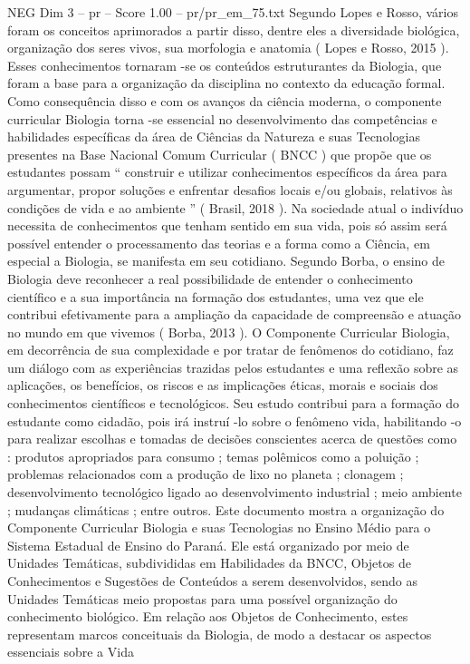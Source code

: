 \begin{textsample}{NEG Dim 3 – pr – Score 1.00 – pr/pr\_em\_75.txt}
Segundo Lopes e Rosso, vários foram os conceitos aprimorados a partir disso, dentre eles a diversidade biológica, organização dos seres vivos, sua morfologia e anatomia ( Lopes e Rosso, 2015 ).
Esses conhecimentos tornaram -se os conteúdos estruturantes da Biologia, que foram a base para a organização da disciplina no contexto da educação formal.
Como consequência disso e com os avanços da ciência moderna, o componente curricular Biologia torna -se essencial no desenvolvimento das competências e habilidades específicas da área de Ciências da Natureza e suas Tecnologias presentes na Base Nacional Comum Curricular ( BNCC ) que propõe que os estudantes possam “ construir e utilizar conhecimentos específicos da área para argumentar, propor soluções e enfrentar desafios locais e/ou globais, relativos às condições de vida e ao ambiente ” ( Brasil, 2018 ).
Na sociedade atual o indivíduo necessita de conhecimentos que tenham sentido em sua vida, pois só assim será possível entender o processamento das teorias e a forma como a Ciência, em especial a Biologia, se manifesta em seu cotidiano.
Segundo Borba, o ensino de Biologia deve reconhecer a real possibilidade de entender o conhecimento científico e a sua importância na formação dos estudantes, uma vez que ele contribui efetivamente para a ampliação da capacidade de compreensão e atuação no mundo em que vivemos ( Borba, 2013 ).
O Componente Curricular Biologia, em decorrência de sua complexidade e por tratar de fenômenos do cotidiano, faz um diálogo com as experiências trazidas pelos estudantes e uma reflexão sobre as aplicações, os benefícios, os riscos e as implicações éticas, morais e sociais dos conhecimentos científicos e tecnológicos.
Seu estudo contribui para a formação do estudante como cidadão, pois irá instruí -lo sobre o fenômeno vida, habilitando -o para realizar escolhas e tomadas de decisões conscientes acerca de questões como : produtos apropriados para consumo ; temas polêmicos como a poluição ; problemas relacionados com a produção de lixo no planeta ; clonagem ; desenvolvimento tecnológico ligado ao desenvolvimento industrial ; meio ambiente ; mudanças climáticas ; entre outros.
Este documento mostra a organização do Componente Curricular Biologia e suas Tecnologias no Ensino Médio para o Sistema Estadual de Ensino do Paraná.
Ele está organizado por meio de Unidades Temáticas, subdivididas em Habilidades da BNCC, Objetos de Conhecimentos e Sugestões de Conteúdos a serem desenvolvidos, sendo as Unidades Temáticas meio propostas para uma possível organização do conhecimento biológico.
Em relação aos Objetos de Conhecimento, estes representam marcos conceituais da Biologia, de modo a destacar os aspectos essenciais sobre a Vida

\end{textsample}
